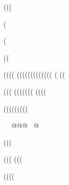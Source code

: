 (((





(

(

((























(((( ((((((((((((( (    ((


((( ((((((( ((((









(((((((((





















@@@@































(((







(((
(((

((((



